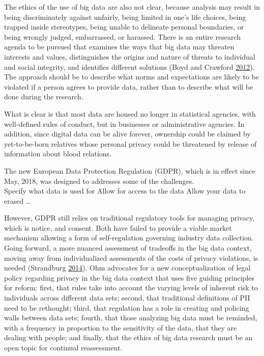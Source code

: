 \documentclass[]{krantz}
\begin{document}
The ethics of the use of big data are also not clear, because analysis
may result in being discriminately against unfairly, being limited in
one's life choices, being trapped inside stereotypes, being unable to
delineate personal boundaries, or being wrongly judged, embarrassed, or
harassed. There is an entire research agenda to be pursued that examines
the ways that big data may threaten interests and values, distinguishes
the origins and nature of threats to individual and social integrity,
and identifies different solutions (Boyd and Crawford
\protect\hyperlink{ref-boyd2012critical}{2012}). The approach should be
to describe what norms and expectations are likely to be violated if a
person agrees to provide data, rather than to describe what will be done
during the research.

What is clear is that most data are housed no longer in statistical
agencies, with well-defined rules of conduct, but in businesses or
administrative agencies. In addition, since digital data can be alive
forever, ownership could be claimed by yet-to-be-born relatives whose
personal privacy could be threatened by release of information about
blood relations.

The new European Data Protection Regulation (GDPR), which is in effect
since May, 2018, was designed to addresses some of the challenges.\\
Specify what data is used for Allow for access to the data Allow your
data to erased \ldots{}

However, GDPR still relies on traditional regulatory tools for managing
privacy, which is notice, and consent. Both have failed to provide a
viable market mechanism allowing a form of self-regulation governing
industry data collection. Going forward, a more nuanced assessment of
tradeoffs in the big data context, moving away from individualized
assessments of the costs of privacy violations, is needed (Strandburg
\protect\hyperlink{ref-Strandburg2014}{2014}). Ohm advocates for a new
conceptualization of legal policy regarding privacy in the big data
context that uses five guiding principles for reform: first, that rules
take into account the varying levels of inherent risk to individuals
across different data sets; second, that traditional definitions of PII
need to be rethought; third, that regulation has a role in creating and
policing walls between data sets; fourth, that those analyzing big data
must be reminded, with a frequency in proportion to the sensitivity of
the data, that they are dealing with people; and finally, that the
ethics of big data research must be an open topic for continual
reassessment.
\end{document}
